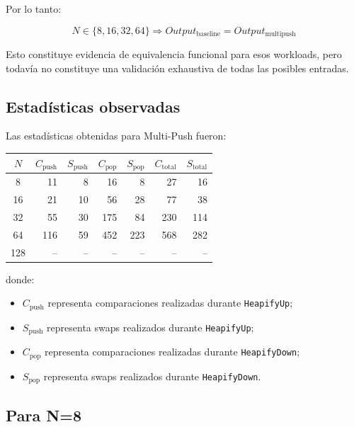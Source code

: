 \documentclass[11pt,a4paper]{article}
\begin{document}
Por lo tanto:

\[
\boxed{
N \in \{8,16,32,64\}
\Rightarrow
Output_{\mathrm{baseline}}
=
Output_{\mathrm{multipush}}
}
\]

Esto constituye evidencia de equivalencia funcional para esos workloads,
pero todavía no constituye una validación exhaustiva de todas las
posibles entradas.

\subsection{Estadísticas observadas}

Las estadísticas obtenidas para Multi-Push fueron:

\begin{center}
\begin{tabular}{c r r r r r r}
\toprule
$N$ &
$C_{\mathrm{push}}$ &
$S_{\mathrm{push}}$ &
$C_{\mathrm{pop}}$ &
$S_{\mathrm{pop}}$ &
$C_{\mathrm{total}}$ &
$S_{\mathrm{total}}$ \\
\midrule
8  & 11  & 8  & 16  & 8   & 27  & 16 \\
16 & 21  & 10 & 56  & 28  & 77  & 38 \\
32 & 55  & 30 & 175 & 84  & 230 & 114 \\
64 & 116 & 59 & 452 & 223 & 568 & 282 \\
128 & -- & -- & -- & -- & -- & -- \\
\bottomrule
\end{tabular}
\end{center}

donde:

\begin{itemize}
    \item $C_{\mathrm{push}}$ representa comparaciones realizadas durante
    \texttt{HeapifyUp};
    \item $S_{\mathrm{push}}$ representa swaps realizados durante
    \texttt{HeapifyUp};
    \item $C_{\mathrm{pop}}$ representa comparaciones realizadas durante
    \texttt{HeapifyDown};
    \item $S_{\mathrm{pop}}$ representa swaps realizados durante
    \texttt{HeapifyDown}.
\end{itemize}

\subsection{Para N=8}
\end{document}
